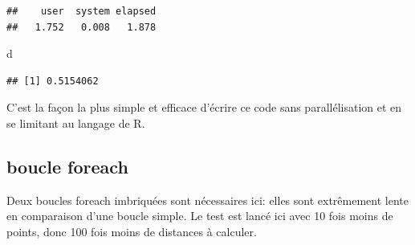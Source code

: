 \documentclass[
  12pt,
  french,
  a4paper,
  extrafontsizes,onecolumn,openright
  ]{memoir}
\newenvironment{Shaded}{\begin{snugshade}}{\end{snugshade}}
\newcommand{\ControlFlowTok}[1]{\textcolor[rgb]{0.13,0.29,0.53}{\textbf{#1}}}
\newcommand{\DataTypeTok}[1]{\textcolor[rgb]{0.13,0.29,0.53}{#1}}
\newcommand{\DecValTok}[1]{\textcolor[rgb]{0.00,0.00,0.81}{#1}}
\newcommand{\KeywordTok}[1]{\textcolor[rgb]{0.13,0.29,0.53}{\textbf{#1}}}
\newcommand{\NormalTok}[1]{#1}
\newcommand{\OperatorTok}[1]{\textcolor[rgb]{0.81,0.36,0.00}{\textbf{#1}}}
\newcommand{\StringTok}[1]{\textcolor[rgb]{0.31,0.60,0.02}{#1}}
\begin{document}
\begin{verbatim}
##    user  system elapsed 
##   1.752   0.008   1.878
\end{verbatim}

\begin{Shaded}
\begin{Highlighting}[]
\NormalTok{d}
\end{Highlighting}
\end{Shaded}

\begin{verbatim}
## [1] 0.5154062
\end{verbatim}

\normalsize
C'est la façon la plus simple et efficace d'écrire ce code sans parallélisation et en se limitant au langage de R.

\hypertarget{boucle-foreach}{%
\subsection{boucle foreach}\label{boucle-foreach}}

Deux boucles foreach imbriquées sont nécessaires ici: elles sont extrêmement lente en comparaison d'une boucle simple.
Le test est lancé ici avec 10 fois moins de points, donc 100 fois moins de distances à calculer.

\scriptsize

\begin{Shaded}
\end{Shaded}
\end{document}
